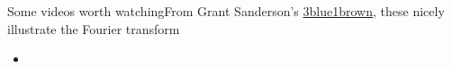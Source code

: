 \begin{frame}{Some videos worth watching}{From Grant Sanderson's \href{https://www.3blue1brown.com/}{3blue1brown}, these nicely illustrate the Fourier transform}

\begin{itemize}
    \item 
\end{itemize}
    
\end{frame}